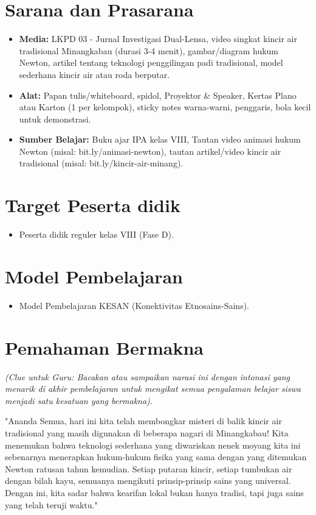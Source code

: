 \documentclass[a4paper,12pt]{article}
\begin{document}
\section{Sarana dan Prasarana}

\begin{itemize}
\item \textbf{Media:} LKPD 03 - Jurnal Investigasi Dual-Lensa, video singkat kincir air tradisional Minangkabau (durasi 3-4 menit), gambar/diagram hukum Newton, artikel tentang teknologi penggilingan padi tradisional, model sederhana kincir air atau roda berputar.
\item \textbf{Alat:} Papan tulis/whiteboard, spidol, Proyektor \& Speaker, Kertas Plano atau Karton (1 per kelompok), sticky notes warna-warni, penggaris, bola kecil untuk demonstrasi.
\item \textbf{Sumber Belajar:} Buku ajar IPA kelas VIII, Tautan video animasi hukum Newton (misal: bit.ly/animasi-newton), tautan artikel/video kincir air tradisional (misal: bit.ly/kincir-air-minang).
\end{itemize}

\section{Target Peserta didik}

\begin{itemize}
\item Peserta didik reguler kelas VIII (Fase D).
\end{itemize}

\section{Model Pembelajaran}

\begin{itemize}
\item Model Pembelajaran KESAN (Konektivitas Etnosains-Sains).
\end{itemize}

\section{Pemahaman Bermakna}
\textit{(Clue untuk Guru: Bacakan atau sampaikan narasi ini dengan intonasi yang menarik di akhir pembelajaran untuk mengikat semua pengalaman belajar siswa menjadi satu kesatuan yang bermakna).}

\begin{tcolorbox}[sectionbox]
"Ananda Semua, hari ini kita telah membongkar misteri di balik kincir air tradisional yang masih digunakan di beberapa nagari di Minangkabau! Kita menemukan bahwa teknologi sederhana yang diwariskan nenek moyang kita ini sebenarnya menerapkan hukum-hukum fisika yang sama dengan yang ditemukan Newton ratusan tahun kemudian. Setiap putaran kincir, setiap tumbukan air dengan bilah kayu, semuanya mengikuti prinsip-prinsip sains yang universal. Dengan ini, kita sadar bahwa kearifan lokal bukan hanya tradisi, tapi juga sains yang telah teruji waktu."
\end{tcolorbox}
\end{document}
